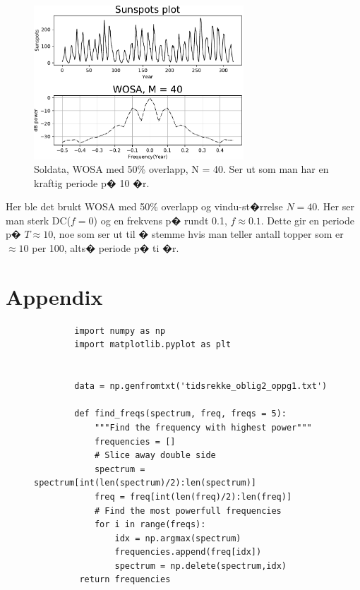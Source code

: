 {\begin{figure}[hbt!]
    {\centering
        \includegraphics[width=0.70\textwidth]{task2.pdf}
        \caption{Soldata, WOSA med 50\% overlapp, N = 40. Ser ut som man har en kraftig periode p� 10 �r.}
        \label{task2}
    \par}
    \end{figure}

Her ble det brukt WOSA med 50\% overlapp og vindu-st�rrelse $N = 40$. Her ser man sterk DC($f=0$) og en frekvens p� rundt 0.1, $f \approx 0.1$. Dette gir en periode p� $T \approx 10$, noe som ser ut til � stemme hvis man teller antall topper som er $\approx 10$ per 100, alts� periode p� ti �r.


\section{Appendix}

\begin{figure}[H]
    \begin{lstlisting}
        import numpy as np 
        import matplotlib.pyplot as plt
        
        
        data = np.genfromtxt('tidsrekke_oblig2_oppg1.txt')
        
        def find_freqs(spectrum, freq, freqs = 5):
            """Find the frequency with highest power"""
            frequencies = []
            # Slice away double side
            spectrum = spectrum[int(len(spectrum)/2):len(spectrum)]
            freq = freq[int(len(freq)/2):len(freq)]
            # Find the most powerfull frequencies
            for i in range(freqs):
                idx = np.argmax(spectrum)
                frequencies.append(freq[idx])
                spectrum = np.delete(spectrum,idx)
         return frequencies


\end{lstlisting}
\end{figure}}
